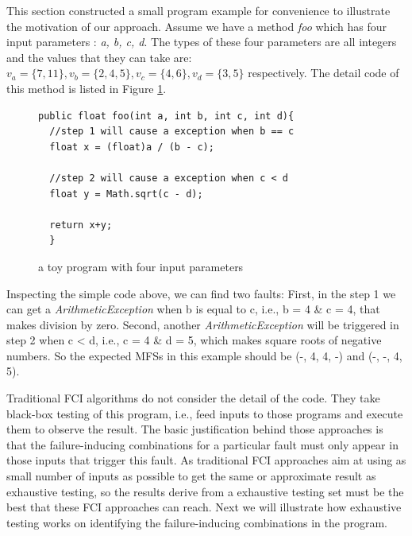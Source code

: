\documentclass{sig-alternate}
\begin{document}
This section constructed a small program example for convenience to illustrate the motivation of our approach. Assume we have a method \emph{foo} which has four input parameters : \emph{a, b, c, d}. The types of these four parameters are all integers and the values that they can take are: $v_{a} = \{7, 11\}, v_{b} = \{2, 4, 5\}, v_{c} = \{4, 6\}, v_{d} = \{3, 5\}$ respectively.  The detail code of this method is listed in Figure \ref{toy-program}.
\begin{figure}
\begin{verbatim}
public float foo(int a, int b, int c, int d){
  //step 1 will cause a exception when b == c
  float x = (float)a / (b - c);

  //step 2 will cause a exception when c < d
  float y = Math.sqrt(c - d);

  return x+y;
  }
\end{verbatim}
\caption{a toy program with four input parameters}
\label{toy-program}
\end{figure}

Inspecting the simple code above, we can find two faults: First, in the step 1 we can get a \emph{ArithmeticException} when b is equal to c, i.e.,  b = 4 \& c = 4, that makes division by zero. Second, another \emph{ArithmeticException} will be triggered in step 2 when c < d, i.e., c = 4 \& d = 5, which makes square roots of negative numbers. So the expected MFSs in this example should be (-, 4, 4, -) and (-, -, 4, 5).

Traditional FCI algorithms do not consider the detail of the code. They take black-box testing of this program, i.e., feed inputs to those programs and execute them to observe the result. The basic justification behind those approaches is that the failure-inducing combinations for a particular fault must only appear in those inputs that trigger this fault. As traditional FCI approaches aim at using as small number of inputs as possible to get the same or approximate result as exhaustive testing, so the results derive from a exhaustive testing set must be the best that these FCI approaches can reach. Next we will illustrate how exhaustive testing works on identifying the failure-inducing combinations in the program.
\end{document}
